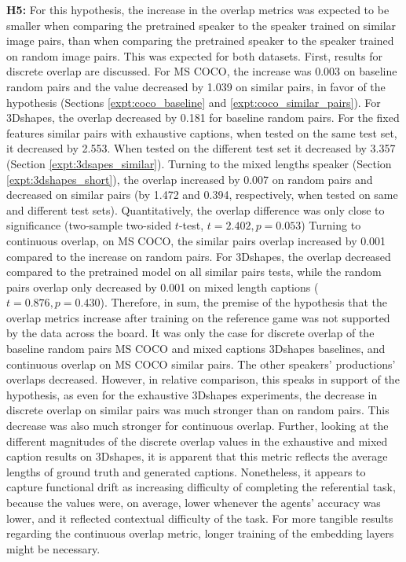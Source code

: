 \textbf{H5:} For this hypothesis, the increase in the overlap metrics was expected to be smaller when comparing the pretrained speaker to the speaker trained on similar image pairs, than when comparing the pretrained speaker to the speaker trained on random image pairs. This was expected for both datasets. First, results for discrete overlap are discussed. 
For MS COCO, the increase was 0.003 on baseline random pairs and the value decreased by 1.039 on similar pairs, in favor of the hypothesis (Sections \ref{expt:coco_baseline} and \ref{expt:coco_similar_pairs}). 
For 3Dshapes, the overlap decreased by 0.181 for baseline random pairs. For the fixed features similar pairs with exhaustive captions, when tested on the same test set, it decreased by 2.553. When tested on the different test set it decreased by 3.357 (Section \ref{expt:3dsapes_similar}). Turning to the mixed lengths speaker (Section \ref{expt:3dshapes_short}), the overlap increased by 0.007 on random pairs and decreased on similar pairs (by 1.472 and 0.394, respectively, when tested on same and different test sets). Quantitatively, the overlap difference was only close to significance (two-sample two-sided $t$-test, $t= 2.402, p = 0.053$)
Turning to continuous overlap, on MS COCO, the similar pairs overlap increased by 0.001 compared to the increase on random pairs. For 3Dshapes, the overlap decreased compared to the pretrained model on all similar pairs tests, while the random pairs overlap only decreased by 0.001 on mixed length captions ($t=0.876, p=0.430$).
Therefore, in sum, the premise of the hypothesis that the overlap metrics increase after training on the reference game was not supported by the data across the board. It was only the case for discrete overlap of the baseline random pairs MS COCO and mixed captions 3Dshapes baselines, and continuous overlap on MS COCO similar pairs. The other speakers' productions' overlaps decreased. However, in relative comparison, this speaks in support of the hypothesis, as even for the exhaustive 3Dshapes experiments, the decrease in discrete overlap on similar pairs was much stronger than on random pairs. This decrease was also much stronger for continuous overlap. 
Further, looking at the different magnitudes of the discrete overlap values in the exhaustive and mixed caption results on 3Dshapes, it is apparent that this metric reflects the average lengths of ground truth and generated captions.
Nonetheless, it appears to capture functional drift as increasing difficulty of completing the referential task, because the values were, on average, lower whenever the agents' accuracy was lower, and it reflected contextual difficulty of the task. For more tangible results regarding the continuous overlap metric, longer training of the embedding layers might be necessary.
